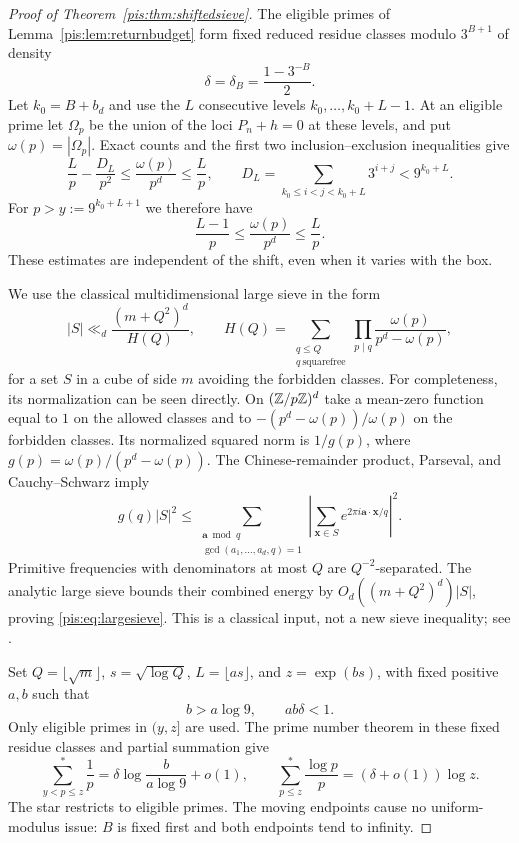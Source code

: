 \documentclass[11pt,a4paper]{article}
\theoremstyle{definition}\newtheorem{definition}[theorem]{Definition}
\theoremstyle{remark}\newtheorem{remark}[theorem]{Remark}
\begin{document}
\begin{proof}[Proof of Theorem~\ref{pis:thm:shiftedsieve}]
The eligible primes of Lemma~\ref{pis:lem:returnbudget} form fixed
reduced residue classes modulo $3^{B+1}$ of density
\[
 \delta=\delta_B=\frac{1-3^{-B}}2.
\]
Let $k_0=B+b_d$ and use the $L$ consecutive levels
$k_0,\ldots,k_0+L-1$. At an eligible prime let $\Omega_p$ be the
union of the loci $P_n+h=0$ at these levels, and put
$\omega(p)=|\Omega_p|$. Exact counts and the first two
inclusion--exclusion inequalities give
\[
 \frac Lp-\frac{D_L}{p^2}\le\frac{\omega(p)}{p^d}\le\frac Lp,
 \qquad
 D_L=\sum_{k_0\le i<j<k_0+L}3^{i+j}<9^{k_0+L}.
\]
For $p>y:=9^{k_0+L+1}$ we therefore have
\begin{equation}\label{pis:eq:uniformforbidden}
 \frac{L-1}{p}\le\frac{\omega(p)}{p^d}\le\frac Lp.
\end{equation}
These estimates are independent of the shift, even when it varies
with the box.

We use the classical multidimensional large sieve in the form
\begin{equation}\label{pis:eq:largesieve}
 |S|\ll_d\frac{(m+Q^2)^d}{H(Q)},\qquad
 H(Q)=\sum_{\substack{q\le Q\\q\ {\text{squarefree}}}}
 \prod_{p\mid q}\frac{\omega(p)}{p^d-\omega(p)},
\end{equation}
for a set $S$ in a cube of side $m$ avoiding the forbidden classes.
For completeness, its normalization can be seen directly. On
$(\mathbb Z/p\mathbb Z)^d$ take a mean-zero function equal to $1$ on the allowed
classes and to $-(p^d-\omega(p))/\omega(p)$ on the forbidden classes.
Its normalized squared norm is $1/g(p)$, where
$g(p)=\omega(p)/(p^d-\omega(p))$. The Chinese-remainder product,
Parseval, and Cauchy--Schwarz imply
\[
 g(q)|S|^2\le
 \sum_{\substack{\mathbf a\bmod q\\
 \gcd(a_1,\ldots,a_d,q)=1}}
 \left|\sum_{\mathbf x\in S}e^{2\pi i\mathbf a\cdot\mathbf x/q}\right|^2.
\]
Primitive frequencies with denominators at most $Q$ are
$Q^{-2}$-separated. The analytic large sieve bounds their combined
energy by $O_d((m+Q^2)^d)|S|$, proving
\eqref{pis:eq:largesieve}. This is a classical input, not a new sieve
inequality; see \cite{Kowalski}.

Set $Q=\lfloor\sqrt m\rfloor$, $s=\sqrt{\log Q}$,
$L=\lfloor a s\rfloor$, and $z=\exp(bs)$, with fixed positive
$a,b$ such that
\[
 b>a\log9,\qquad ab\delta<1.
\]
Only eligible primes in $(y,z]$ are used. The prime number theorem
in these fixed residue classes and partial summation give
\[
 \sum_{y<p\le z}^{*}\frac1p
 =\delta\log\frac{b}{a\log9}+o(1),\qquad
 \sum_{p\le z}^{*}\frac{\log p}{p}=(\delta+o(1))\log z.
\]
The star restricts to eligible primes. The moving endpoints cause
no uniform-modulus issue: $B$ is fixed first and both endpoints
tend to infinity.


\end{proof}
\end{document}
